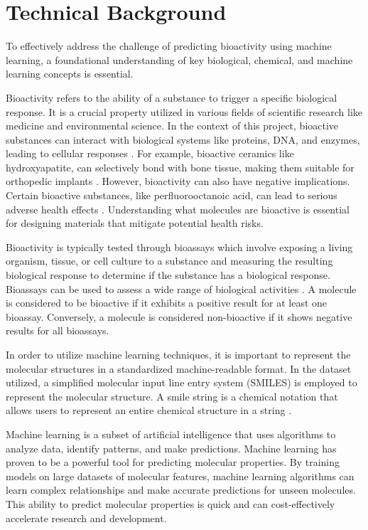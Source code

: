 \documentclass[10pt,twocolumn]{article}
\begin{document}
\section{Technical Background}

To effectively address the challenge of predicting bioactivity using machine learning, a foundational understanding of key biological, chemical, and machine learning concepts is essential. 

Bioactivity refers to the ability of a substance to trigger a specific biological response. It is a crucial property utilized in various fields of scientific research like medicine and environmental science. In the context of this project, bioactive substances can interact with biological systems like proteins, DNA, and enzymes, leading to cellular responses \textcite{bioactivity}. For example, bioactive ceramics like hydroxyapatite, can selectively bond with bone tissue, making them suitable for orthopedic implants \textcite{bone}. However, bioactivity can also have negative implications. Certain bioactive substances, like perfluorooctanoic acid, can lead to serious adverse health effects \textcite{acid}. Understanding what molecules are bioactive is essential for designing materials that mitigate potential health risks. 

Bioactivity is typically tested through bioassays which involve exposing a living organism, tissue, or cell culture to a substance and measuring the resulting biological response to determine if the substance has a biological response. Bioassays can be used to assess a wide range of biological activities \textcite{bioassay}. A molecule is considered to be bioactive if it exhibits a positive result for at least one bioassay. Conversely, a molecule is considered non-bioactive if it shows negative results for all bioassays. 

In order to utilize machine learning techniques, it is important to represent the molecular structures in a standardized machine-readable format. In the dataset utilized, a simplified molecular input line entry system (SMILES) is employed to represent the molecular structure. A smile string is a chemical notation that allows users to represent an entire chemical structure in a string \textcite{smiles}. 

Machine learning is a subset of artificial intelligence that uses algorithms to analyze data, identify patterns, and make predictions. Machine learning has proven to be a powerful tool for predicting molecular properties. By training models on large datasets of molecular features, machine learning algorithms can learn complex relationships and make accurate predictions for unseen molecules. This ability to predict molecular properties is quick and can cost-effectively accelerate research and development.  
\end{document}
